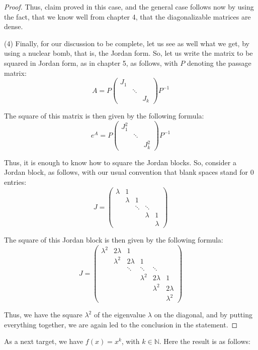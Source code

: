 \documentclass[12pt]{amsbook}
\begin{document}
\begin{proof}
Thus, claim proved in this case, and the general case follows now by using the fact, that we know well from chapter 4, that the diagonalizable matrices are dense.

\medskip

(4) Finally, for our discussion to be complete, let us see as well what we get, by using a nuclear bomb, that is, the Jordan form. So, let us write the matrix to be squared in Jordan form, as in chapter 5, as follows, with $P$ denoting the passage matrix:
$$A=P\begin{pmatrix}
J_1\\
&\ddots\\
&&J_k
\end{pmatrix}P^{-1}$$

The square of this matrix is then given by the following formula:
$$e^A=P\begin{pmatrix}
J_1^2\\
&\ddots\\
&&J_k^2
\end{pmatrix}P^{-1}$$

Thus, it is enough to know how to square the Jordan blocks. So, consider a Jordan block, as follows, with our usual convention that blank spaces stand for $0$ entries:
$$J=\begin{pmatrix}
\lambda&1\\
&\lambda&1\\
&&\ddots&\ddots\\
&&&\lambda&1\\
&&&&\lambda
\end{pmatrix}$$

The square of this Jordan block is then given by the following formula:
$$J=\begin{pmatrix}
\lambda^2&2\lambda&1\\
&\lambda^2&2\lambda&1\\
&&\ddots&\ddots&\ddots\\
&&&\lambda^2&2\lambda&1\\
&&&&\lambda^2&2\lambda\\
&&&&&\lambda^2
\end{pmatrix}$$

Thus, we have the square $\lambda^2$ of the eigenvalue $\lambda$ on the diagonal, and by putting everything together, we are again led to the conclusion in the statement.
\end{proof}

As a next target, we have $f(x)=x^k$, with $k\in\mathbb N$. Here the result is as follows:
\end{document}
